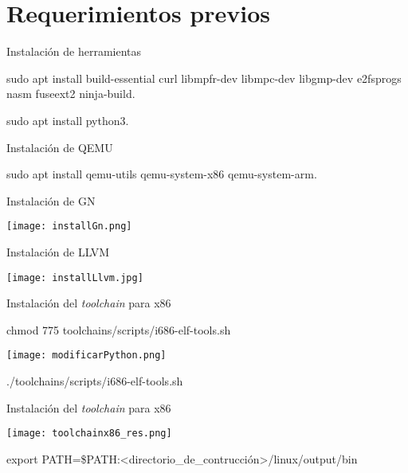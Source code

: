 \section{Requerimientos previos}
\begin{frame}{Instalación de herramientas}
	\begin{center}
		\ttfamily
		sudo apt install build-essential curl libmpfr-dev libmpc-dev libgmp-dev e2fsprogs nasm fuseext2 ninja-build.
	\end{center}

	\begin{center}
		\ttfamily
		sudo apt install python3.
	\end{center}
	
\end{frame}

\begin{frame}{Instalación de QEMU}
	
	\begin{center}
		\ttfamily
		sudo apt install qemu-utils qemu-system-x86 qemu-system-arm.
	\end{center}
\end{frame}

\begin{frame}{Instalación de GN}
	\begin{center}
		\texttt{[image: installGn.png]}
	\end{center}
\end{frame}

\begin{frame}{Instalación de LLVM}
	\begin{center}
		\texttt{[image: installLlvm.jpg]}
	\end{center}
\end{frame}

\begin{frame}{Instalación del \textit{toolchain} para x86}
	\begin{center}
		\ttfamily
		chmod 775 toolchains/scripts/i686-elf-tools.sh
		
		
		
		\texttt{[image: modificarPython.png]}
		
		
		
		./toolchains/scripts/i686-elf-tools.sh
	\end{center}
\end{frame}

\begin{frame}{Instalación del \textit{toolchain} para x86}
	\begin{center}
		\texttt{[image: toolchainx86\_res.png]}
		
		
		
		\ttfamily
		export PATH=\$PATH:<directorio\_de\_contrucción>/linux/output/bin
	\end{center}
\end{frame}


